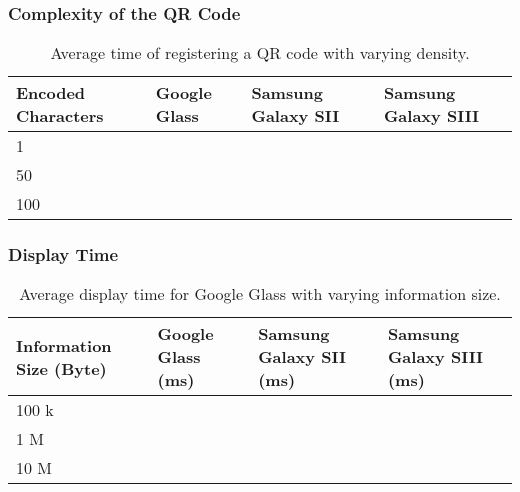 \subsubsection{Complexity of the QR Code}

	\begin{table}[H]%
    		\caption{Average time of registering a QR code with varying density.} \label{tab:complexityAverage}
		\centering \begin{tabularx}{\textwidth}{l|X|X|X} \hline
		\textbf{Encoded Characters} & \textbf{Google Glass} & \textbf{Samsung Galaxy SII} & \textbf{Samsung Galaxy SIII} \\ \hline \hline
       
		1	&	&	&	\\ \hline
		50	&	&	&	\\ \hline
		100	&	&	&	\\ \hline
		
		\end{tabularx}
	\end{table}

\subsubsection{Display Time}

	\begin{table}[ht!]
    		\caption{Average display time for Google Glass with varying information size.} \label{tab:averageDisplaySpeedGoogleGlass}
		\centering \begin{tabularx}{\textwidth}{l|X|X|X} \hline
		\textbf{Information Size (Byte)} & \textbf{Google Glass (ms)}  & \textbf{Samsung Galaxy SII (ms)}  & \textbf{Samsung Galaxy SIII (ms)} \\ \hline \hline
       
		100 k	&	&	&	 \\ \hline
		1 M		&	&	&	 \\ \hline
		10 M		&	&	&	 \\ \hline

		\end{tabularx}
	\end{table}